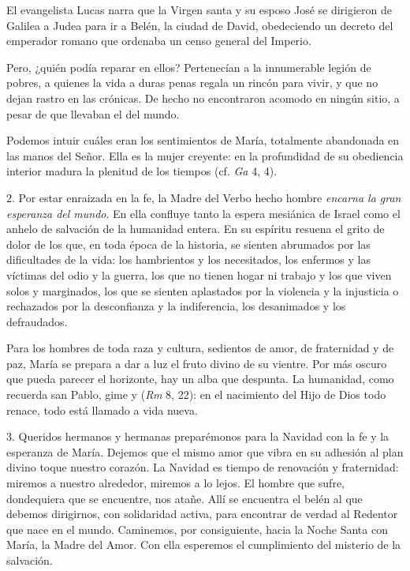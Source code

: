 El evangelista Lucas narra que la Virgen santa y su esposo José se dirigieron de Galilea a Judea para ir a Belén, la ciudad de David, obedeciendo un decreto del emperador romano que ordenaba un censo general del Imperio.

Pero, ¿quién podía reparar en ellos? Pertenecían a la innumerable legión de pobres, a quienes la vida a duras penas regala un rincón para vivir, y que no dejan rastro en las crónicas. De hecho no encontraron acomodo en ningún sitio, a pesar de que llevaban el  del mundo.

Podemos intuir cuáles eran los sentimientos de María, totalmente abandonada en las manos del Señor. Ella es la mujer creyente: en la profundidad de su obediencia interior madura la plenitud de los tiempos (cf. \emph{Ga} 4, 4).

2. Por estar enraizada en la fe, la Madre del Verbo hecho hombre \emph{encarna la gran esperanza del mundo}. En ella confluye tanto la espera mesiánica de Israel como el anhelo de salvación de la humanidad entera. En su espíritu resuena el grito de dolor de los que, en toda época de la historia, se sienten abrumados por las dificultades de la vida: los hambrientos y los necesitados, los enfermos y las víctimas del odio y la guerra, los que no tienen hogar ni trabajo y los que viven solos y marginados, los que se sienten aplastados por la violencia y la injusticia o rechazados por la desconfianza y la indiferencia, los desanimados y los defraudados.

Para los hombres de toda raza y cultura, sedientos de amor, de fraternidad y de paz, María se prepara a dar a luz el fruto divino de su vientre. Por más oscuro que pueda parecer el horizonte, hay un alba que despunta. La humanidad, como recuerda san Pablo, gime y  (\emph{Rm} 8, 22): en el nacimiento del Hijo de Dios todo renace, todo está llamado a vida nueva.

3. Queridos hermanos y hermanas preparémonos para la Navidad con la fe y la esperanza de María. Dejemos que el mismo amor que vibra en su adhesión al plan divino toque nuestro corazón. La Navidad es tiempo de renovación y fraternidad: miremos a nuestro alrededor, miremos a lo lejos. El hombre que sufre, dondequiera que se encuentre, nos atañe. Allí se encuentra el belén al que debemos dirigirnos, con solidaridad activa, para encontrar de verdad al Redentor que nace en el mundo. Caminemos, por consiguiente, hacia la Noche Santa con María, la Madre del Amor. Con ella esperemos el cumplimiento del misterio de la salvación.


